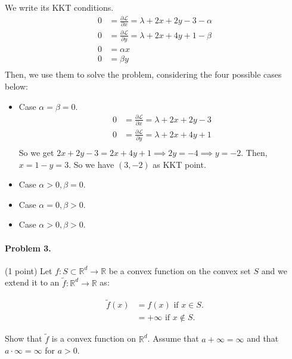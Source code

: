 \documentclass[12pt]{scrartcl}
\begin{document}
We write its KKT conditions.
\begin{align*}
    0 &= \frac{\partial \mathcal{L}}{\partial x} = \lambda + 2x + 2y -3 - \alpha\\
    0 &= \frac{\partial \mathcal{L}}{\partial y} = \lambda + 2x + 4y + 1 - \beta\\
    0 &= \alpha x \\
    0 &= \beta y \\
\end{align*}
Then, we use them to solve the problem, considering the four possible cases below:
\begin{itemize}
    \item Case $\alpha = \beta = 0$.
    \begin{align*}
        0 &= \frac{\partial \mathcal{L}}{\partial x} = \lambda + 2x + 2y -3 \\
        0 &= \frac{\partial \mathcal{L}}{\partial y} = \lambda + 2x + 4y + 1 \\
    \end{align*}
    So we get $2x + 2y -3 = 2x + 4y +1 \implies 2y = -4 \implies y = -2$. Then, $x = 1-y = 3$. So we have $(3, -2)$ as KKT point.
    \item Case $\alpha > 0, \beta = 0$.
    \item Case $\alpha = 0, \beta > 0$.
    \item Case $\alpha > 0, \beta > 0$.
\end{itemize}








\begin{boxF}
\paragraph*{Problem 3.} (1 point) \hspace{0.15em} Let $f : S \subset \mathbb{R}^d \to \mathbb{R}$ be a convex function on the convex set $S$ and we extend it to an $\tilde f : \mathbb{R}^d \to \mathbb{R}$ as:

    \begin{align*}
        \tilde f(x) &= f(x) \mbox{ if } x \in S. \\
                    &= +\infty \mbox{ if } x \notin S.
    \end{align*}

Show that $\tilde f$ is a convex function on $\mathbb{R}^d$. Assume that $a + \infty = \infty $ and that $ a \cdot \infty = \infty$ for $a > 0$.
\end{boxF}
\end{document}
